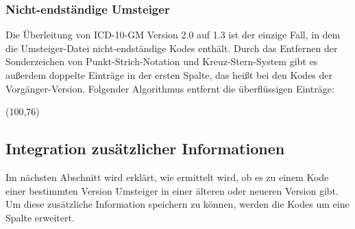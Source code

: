 \subsubsection{Nicht-endständige Umsteiger}

Die Überleitung von ICD-10-GM Version 2.0 auf 1.3 ist der einzige Fall, in dem die Umsteiger-Datei nicht-endständige Kodes enthält. Durch das Entfernen der Sonderzeichen von Punkt-Strich-Notation und Kreuz-Stern-System gibt es außerdem doppelte Einträge in der ersten Spalte, das heißt bei den Kodes der Vorgänger-Version. Folgender Algorithmus entfernt die überflüssigen Einträge:

\newpage

\begin{struktogramm}(100,76)
    \change
    \ifend
    \whileend
\end{struktogramm}

\subsection{Integration zusätzlicher Informationen}

Im nächsten Abschnitt wird erklärt, wie ermittelt wird, ob es zu einem Kode einer bestimmten Version Umsteiger in einer älteren oder neueren Version gibt. Um diese zusätzliche Information speichern zu können, werden die Kodes um eine Spalte erweitert. 







